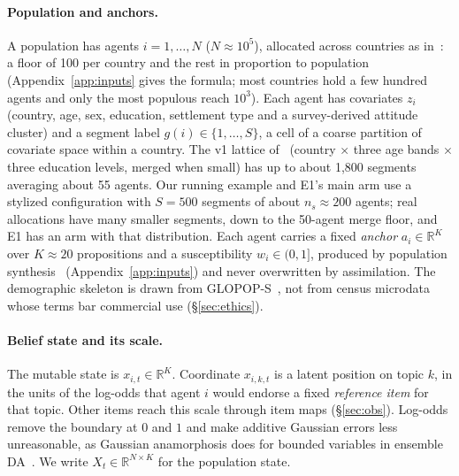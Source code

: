 \documentclass[10pt]{article}
\theoremstyle{remark}
\newcommand{\R}{\mathbb{R}}
\begin{document}
\paragraph{Population and anchors.} A population has agents $i=1,\dots,N$ ($N\approx10^5$), allocated across countries as in~\cite{rw_unequally}: a floor of 100 per country and the rest in proportion to population (Appendix~\ref{app:inputs} gives the formula; most countries hold a few hundred agents and only the most populous reach $10^3$). Each agent has covariates $z_i$ (country, age, sex, education, settlement type and a survey-derived attitude cluster) and a segment label $g(i)\in\{1,\dots,S\}$, a cell of a coarse partition of covariate space within a country. The v1 lattice of~\cite{rw_askaworld} (country $\times$ three age bands $\times$ three education levels, merged when small) has up to about 1,800 segments averaging about 55 agents. Our running example and E1's main arm use a stylized configuration with $S=500$ segments of about $n_s\approx200$ agents; real allocations have many smaller segments, down to the 50-agent merge floor, and E1 has an arm with that distribution. Each agent carries a fixed \emph{anchor} $a_i\in\R^K$ over $K\approx20$ propositions and a susceptibility $w_i\in(0,1]$, produced by population synthesis~\cite{rw_unequally} (Appendix~\ref{app:inputs}) and never overwritten by assimilation. The demographic skeleton is drawn from GLOPOP-S~\cite{ton2024glopop,ton2024glopopdata}, not from census microdata whose terms bar commercial use (\S\ref{sec:ethics}).

\paragraph{Belief state and its scale.} The mutable state is $x_{i,t}\in\R^K$. Coordinate $x_{i,k,t}$ is a latent position on topic $k$, in the units of the log-odds that agent $i$ would endorse a fixed \emph{reference item} for that topic. Other items reach this scale through item maps (\S\ref{sec:obs}). Log-odds remove the boundary at $0$ and $1$ and make additive Gaussian errors less unreasonable, as Gaussian anamorphosis does for bounded variables in ensemble DA~\cite{bertino2003}. We write $X_t\in\R^{N\times K}$ for the population state.
\end{document}
